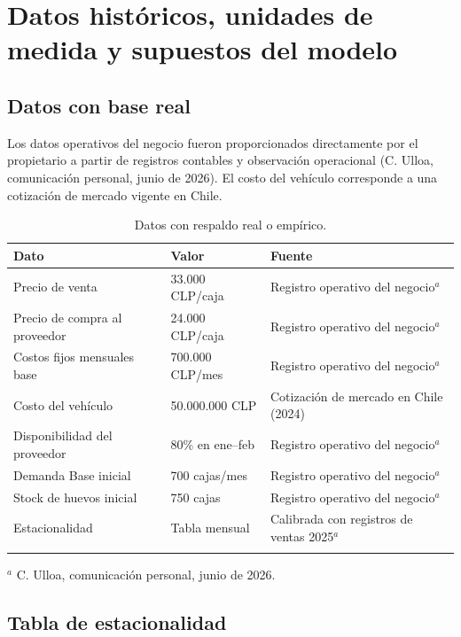 \documentclass[10pt,a4paper]{article}
\begin{document}
\newpage

\section{Datos históricos, unidades de medida y supuestos del modelo}

\subsection{Datos con base real}

Los datos operativos del negocio fueron proporcionados directamente por el propietario a partir de registros contables y observación operacional (C. Ulloa, comunicación personal, junio de 2026). El costo del vehículo corresponde a una cotización de mercado vigente en Chile.

\begin{longtable}{p{5cm} p{3cm} p{6cm}}
\toprule
Dato & Valor & Fuente \\
\midrule
\endhead
Precio de venta & 33.000 CLP/caja & Registro operativo del negocio$^{a}$ \\
Precio de compra al proveedor & 24.000 CLP/caja & Registro operativo del negocio$^{a}$ \\
Costos fijos mensuales base & 700.000 CLP/mes & Registro operativo del negocio$^{a}$ \\
Costo del vehículo & 50.000.000 CLP & Cotización de mercado en Chile (2024) \\
Disponibilidad del proveedor & 80\% en ene–feb & Registro operativo del negocio$^{a}$ \\
Demanda Base inicial & 700 cajas/mes & Registro operativo del negocio$^{a}$ \\
Stock de huevos inicial & 750 cajas & Registro operativo del negocio$^{a}$ \\
Estacionalidad & Tabla mensual & Calibrada con registros de ventas 2025$^{a}$ \\
\bottomrule
\caption{Datos con respaldo real o empírico.}
\end{longtable}

\noindent\small$^{a}$ C. Ulloa, comunicación personal, junio de 2026.

\subsection{Tabla de estacionalidad}
\end{document}
